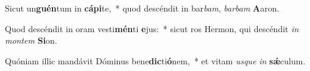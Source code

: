 \item Sicut un\textbf{guén}tum in \textbf{cá}\textbf{pi}te,~* quod descéndit in bar\textit{bam}, \textit{bar}\textit{bam} \textbf{A}aron.
\item Quod descéndit in oram vesti\textbf{mén}ti \textbf{e}jus:~* sicut ros Hermon, qui descéndit \textit{in} \textit{mon}\textit{tem} \textbf{Si}on.
\item Quóniam illic mandávit Dóminus bene\textbf{dic}ti\textbf{ó}nem,~* et vitam \textit{us}\textit{que} \textit{in} \textbf{sǽ}culum.
